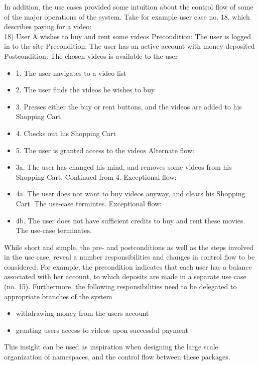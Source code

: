 In addition, the use cases provided some intuition about the control flow of some of the major operations of the system. Take for example user case no. 18, which describes paying for a video:\\

18)
User A wishes to buy and rent some videos
\newline Precondition: The user is logged in to the site
\newline Precondition: The user has an active account with money deposited
\newline Postcondition: The chosen videos is available to the user
\begin{itemize}
	\item 1. The user navigates to a video list
	\item 2. The user finds the videos he wishes to buy
    \item 3. Presses either the buy or rent buttons, and the videos are added to his Shopping Cart
    \item 4. Checks out his Shopping Cart
    \item 5. The user is granted access to the videos
\newline Alternate flow:
    \item 3a. The user has changed his mind, and removes some videos from his Shopping Cart. Continued from 4.
\newline Exceptional flow:
    \item 4a. The user does not want to buy videos anyway, and clears his Shopping Cart. The use-case termintes.
\newline Exceptional flow:
    \item 4b. The user does not have sufficient credits to buy and rent these movies. The use-case terminates.
\end{itemize}

While short and simple, the pre- and postconditions as well as the steps involved in the use case, reveal a number responsibilities and changes in control flow to be considered. For example, the precondition indicates that each user has a balance associated with her account, to which deposits are made  in a separate use case (no. 15). Furthermore, the following responsibilities need to be delegated to appropriate branches of the system
\begin{itemize}
\item withdrawing money from the users account
\item granting users access to videos upon successful payment
\end{itemize}
This insight can be used as inspiration when designing the large scale organization of namespaces, and the control flow between these packages.


